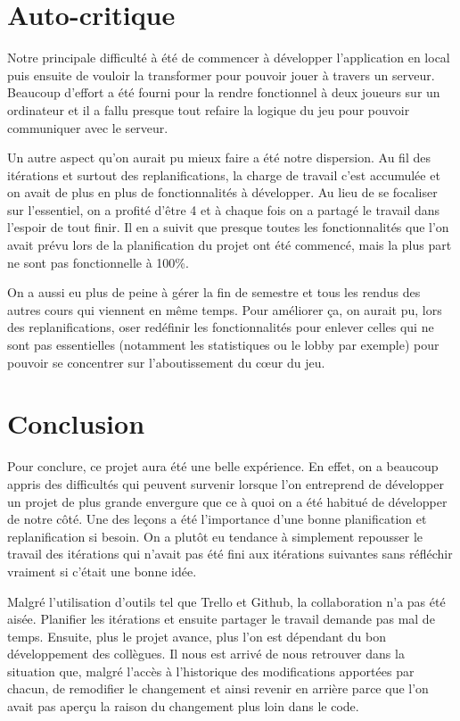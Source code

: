 \documentclass[a4paper,12pt]{article}
\begin{document}
	
	\section{Auto-critique}
	
	Notre principale difficulté à été de commencer à développer l'application en local puis ensuite de vouloir la transformer pour pouvoir jouer à travers un serveur. Beaucoup d'effort a été fourni pour la rendre fonctionnel à deux joueurs sur un ordinateur et il a fallu presque tout refaire la logique du jeu pour pouvoir communiquer avec le serveur.
	
	Un autre aspect qu'on aurait pu mieux faire a été notre dispersion. Au fil des itérations et surtout des replanifications, la charge de travail c'est accumulée et on avait de plus en plus de fonctionnalités à développer. Au lieu de se focaliser sur l'essentiel, on a profité d'être 4 et à chaque fois on a partagé le travail dans l'espoir de tout finir. Il en a suivit que presque toutes les fonctionnalités que l'on avait prévu lors de la planification du projet ont été commencé, mais la plus part ne sont pas fonctionnelle à 100\%.
	
	On a aussi eu plus de peine à gérer la fin de semestre et tous les rendus des autres cours qui viennent en même temps. Pour améliorer ça, on aurait pu, lors des replanifications, oser redéfinir les fonctionnalités pour enlever celles qui ne sont pas essentielles (notamment les statistiques ou le lobby par exemple) pour pouvoir se concentrer sur l'aboutissement du cœur du jeu.


	\section{Conclusion}
	Pour conclure, ce projet aura été une belle expérience. En effet, on a beaucoup appris des difficultés qui peuvent survenir lorsque l'on entreprend de développer un projet de plus grande envergure que ce à quoi on a été habitué de développer de notre côté. Une des leçons a été l'importance d'une bonne planification et replanification si besoin. On a plutôt eu tendance à simplement repousser le travail des itérations qui n'avait pas été fini aux itérations suivantes sans réfléchir vraiment si c'était une bonne idée.
	
	Malgré l'utilisation d'outils tel que Trello et Github, la collaboration n'a pas été aisée. Planifier les itérations et ensuite partager le travail demande pas mal de temps. Ensuite, plus le projet avance, plus l'on est dépendant du bon développement des collègues. Il nous est arrivé de nous retrouver dans la situation que, malgré l'accès à l'historique des modifications apportées par chacun, de remodifier le changement et ainsi revenir en arrière parce que l'on avait pas aperçu la raison du changement plus loin dans le code.
	
\end{document}
